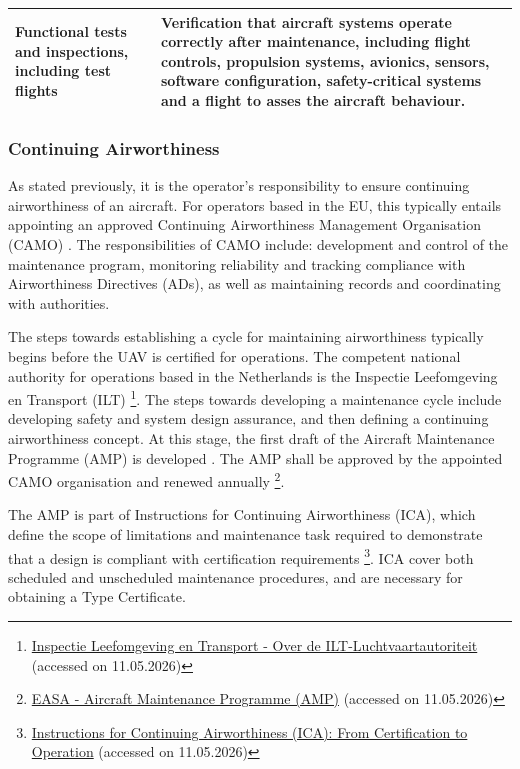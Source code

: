 \begin{longtable}{|p{}| p{}|}
Functional tests and inspections, including test flights &
Verification that aircraft systems operate correctly after maintenance, including flight controls, propulsion systems, avionics, sensors, software configuration, safety-critical systems and a flight to asses the aircraft behaviour. \\
\hline


\end{longtable}

\subsubsection*{Continuing Airworthiness}
As stated previously, it is the operator's responsibility to ensure continuing airworthiness of an aircraft. For operators based in the EU, this typically entails appointing an approved Continuing Airworthiness Management Organisation (CAMO) \cite{EASA_CAirworthiness}. The responsibilities of CAMO include: development and control of the maintenance program, monitoring reliability and tracking compliance with Airworthiness Directives (ADs), as well as maintaining records and coordinating with authorities.

The steps towards establishing a cycle for maintaining airworthiness typically begins before the UAV is certified for operations. The competent national authority for operations based in the Netherlands is the Inspectie Leefomgeving en Transport (ILT) \footnote{\label{url:ILT}\href{https://www.ilent.nl/ilt-luchtvaartautoriteit}{Inspectie Leefomgeving en Transport - Over de ILT-Luchtvaartautoriteit} (accessed on 11.05.2026)}. The steps towards developing a maintenance cycle include developing safety and system design assurance, and then defining a continuing airworthiness concept. At this stage, the first draft of the Aircraft Maintenance Programme (AMP) is developed \cite{EASA_CAirworthiness}. The AMP shall be approved by the appointed CAMO organisation and renewed annually \footnote{\href{https://www.easa.europa.eu/en/the-agency/faqs/amp-aircraft-maintenance-programme}{EASA - Aircraft Maintenance Programme (AMP)} (accessed on 11.05.2026)}.

The AMP is part of Instructions for Continuing Airworthiness (ICA), which define the scope of limitations and maintenance task required to demonstrate that a design is compliant with certification requirements \footnote{\href{https://www.leanairline.com/blog/instructions-for-continuing-airworthiness}{Instructions for Continuing Airworthiness (ICA): From Certification to Operation} (accessed on 11.05.2026)}. ICA cover both scheduled and unscheduled maintenance procedures, and are necessary for obtaining a Type Certificate.

